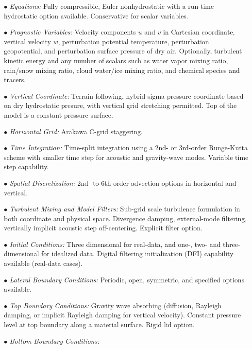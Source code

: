 \begin{description}
\setlength{\itemsep}{-5pt}
\item{$\bullet$} {\em Equations:}
Fully compressible, Euler nonhydrostatic with 
a run-time hydrostatic option available. Conservative for scalar variables.
%
\item{$\bullet$} {\em Prognostic Variables:}
Velocity components $u$ and $v$ in Cartesian coordinate, vertical velocity $w$, 
perturbation potential temperature, perturbation geopotential, 
and perturbation surface pressure of dry air.
Optionally, turbulent kinetic energy and any number of scalars
such as water vapor mixing ratio, rain/snow mixing ratio,
cloud water/ice mixing ratio, and chemical species and tracers.
%
\item{$\bullet$} {\em Vertical Coordinate:}
Terrain-following, hybrid sigma-pressure coordinate based on dry hydrostatic presure, 
with vertical grid stretching permitted.
Top of the model is a constant pressure surface.
%
\item{$\bullet$} {\em Horizontal Grid:}
Arakawa C-grid staggering. 
%
\item{$\bullet$} {\em Time Integration:}
Time-split integration using a 2nd- or 3rd-order Runge-Kutta scheme with
smaller time step for acoustic and gravity-wave modes. 
Variable time step capability.
%
\item{$\bullet$} {\em Spatial Discretization:}
2nd- to 6th-order advection options in horizontal and vertical.
%
\item{$\bullet$} {\em Turbulent Mixing and Model Filters:} Sub-grid scale
turbulence formulation in both coordinate and physical space.
Divergence damping, external-mode filtering, vertically implicit
acoustic step off-centering. Explicit filter option.
%
\item{$\bullet$} {\em Initial Conditions:}
Three dimensional for real-data, and one-, two- and 
three-dimensional for idealized data. 
Digital filtering initialization (DFI) capability 
available (real-data cases).
%
\item{$\bullet$} {\em Lateral Boundary Conditions:} 
Periodic, open, symmetric, and specified options available.
%
\item{$\bullet$} {\em Top Boundary Conditions:} 
Gravity wave absorbing (diffusion, Rayleigh damping, or implicit 
Rayleigh damping for vertical velocity).  
Constant pressure level at top boundary along a material surface. 
Rigid lid option.
%
\item{$\bullet$} {\em Bottom Boundary Conditions:} 

\end{description}
